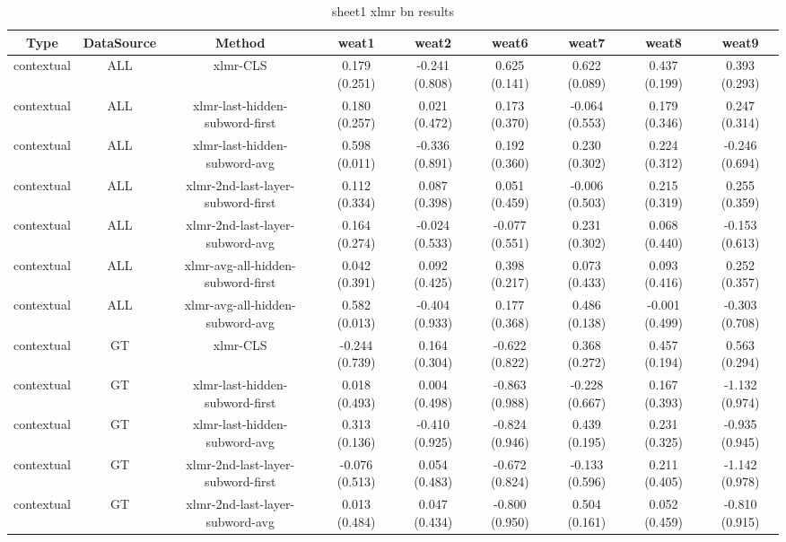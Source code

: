 \begin{sidewaystable}[htb]
    \centering
    \caption{sheet1 xlmr bn results}
    \label{appendix_tab:sheet1_xlmr_bn_results}
    \small
    \begin{tabular}{@{}ccccccccc@{}}
        \toprule
        Type & DataSource & Method & weat1 & weat2 & weat6 & weat7 & weat8 & weat9 \\
        \midrule
        contextual & ALL & xlmr-CLS & 0.179 (0.251) & -0.241 (0.808) & 0.625 (0.141) & 0.622 (0.089) & 0.437 (0.199) & 0.393 (0.293) \\
        contextual & ALL & xlmr-last-hidden-subword-first & 0.180 (0.257) & 0.021 (0.472) & 0.173 (0.370) & -0.064 (0.553) & 0.179 (0.346) & 0.247 (0.314) \\
        contextual & ALL & xlmr-last-hidden-subword-avg & 0.598 (0.011) & -0.336 (0.891) & 0.192 (0.360) & 0.230 (0.302) & 0.224 (0.312) & -0.246 (0.694) \\
        contextual & ALL & xlmr-2nd-last-layer-subword-first & 0.112 (0.334) & 0.087 (0.398) & 0.051 (0.459) & -0.006 (0.503) & 0.215 (0.319) & 0.255 (0.359) \\
        contextual & ALL & xlmr-2nd-last-layer-subword-avg & 0.164 (0.274) & -0.024 (0.533) & -0.077 (0.551) & 0.231 (0.302) & 0.068 (0.440) & -0.153 (0.613) \\
        contextual & ALL & xlmr-avg-all-hidden-subword-first & 0.042 (0.391) & 0.092 (0.425) & 0.398 (0.217) & 0.073 (0.433) & 0.093 (0.416) & 0.252 (0.357) \\
        contextual & ALL & xlmr-avg-all-hidden-subword-avg & 0.582 (0.013) & -0.404 (0.933) & 0.177 (0.368) & 0.486 (0.138) & -0.001 (0.499) & -0.303 (0.708) \\
        contextual & GT & xlmr-CLS & -0.244 (0.739) & 0.164 (0.304) & -0.622 (0.822) & 0.368 (0.272) & 0.457 (0.194) & 0.563 (0.294) \\
        contextual & GT & xlmr-last-hidden-subword-first & 0.018 (0.493) & 0.004 (0.498) & -0.863 (0.988) & -0.228 (0.667) & 0.167 (0.393) & -1.132 (0.974) \\
        contextual & GT & xlmr-last-hidden-subword-avg & 0.313 (0.136) & -0.410 (0.925) & -0.824 (0.946) & 0.439 (0.195) & 0.231 (0.325) & -0.935 (0.945) \\
        contextual & GT & xlmr-2nd-last-layer-subword-first & -0.076 (0.513) & 0.054 (0.483) & -0.672 (0.824) & -0.133 (0.596) & 0.211 (0.405) & -1.142 (0.978) \\
        contextual & GT & xlmr-2nd-last-layer-subword-avg & 0.013 (0.484) & 0.047 (0.434) & -0.800 (0.950) & 0.504 (0.161) & 0.052 (0.459) & -0.810 (0.915) \\

\end{tabular}
\end{sidewaystable}
